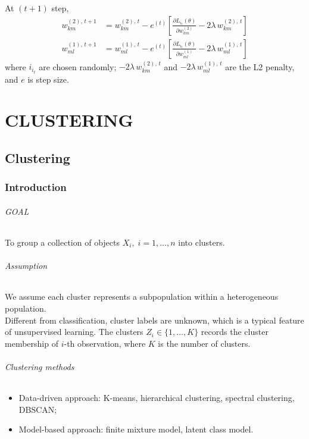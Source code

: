 \documentclass[12pt]{book}
\theoremstyle{definition}
\theoremstyle{remark}
\begin{document}
At $(t+1)$ step, 
\begin{align*}
w^{(2),\,t+1}_{km}
&= w^{(2),\,t}_{km}
- e^{(t)}[\frac{\partial L_{i_{t}}(\theta)}{\partial w^{(2)}_{km}}
-2\lambda\,w^{(2),\,t}_{km}]\\
w^{(1),\,t+1}_{ml}
&= w^{(1),\,t}_{ml}
- e^{(t)}[\frac{\partial L_{i_{t}}(\theta)}{\partial w^{(1)}_{ml}}
-2\lambda\,w^{(1),\,t}_{ml}]
\end{align*}
where $i_{i_{t}}$ are chosen randomly; $-2\lambda\,w^{(2),\,t}_{km}$ and $-2\lambda\,w^{(1),\,t}_{ml}$ are the L2 penalty, and $e$ is step size.











\newpage
\part{CLUSTERING}
\chapter{Clustering}
\section{Introduction}
\paragraph{GOAL} To group a collection of objects $X_i,\;i = 1,\dots, n$ into clusters.
\paragraph{Assumption} We assume each cluster represents a subpopulation within a heterogeneous population.\\

Different from classification, cluster labels are unknown, which is a typical feature of unsupervised learning. The clusters $Z_i \in \{1,\dots,K\}$ records the cluster membership of $i$-th observation, where $K$ is the number of clusters.


\paragraph{Clustering methods}
\begin{itemize}
    \item Data-driven approach: K-means, hierarchical clustering, spectral clustering, DBSCAN;
    \item Model-based approach: finite mixture model, latent class model.
\end{itemize}
\end{document}
